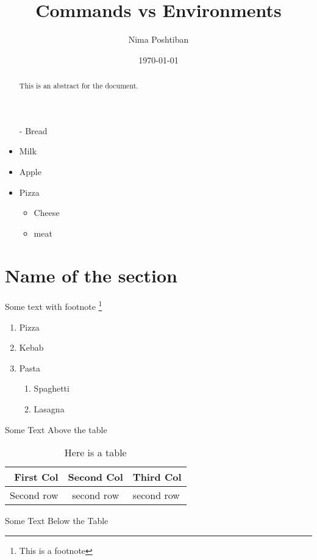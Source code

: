 \documentclass{article}
\title{Commands vs Environments}
\author{Nima Poshtiban}
\date{\today}
\begin{document}
\maketitle	
\begin{abstract}
	This is an abstract for the document.
\end{abstract}

\begin{itemize}
	\item[-] Bread %
	\item Milk
	\item Apple
	\item Pizza
	\begin{itemize}
		\item Cheese
		\item meat
	\end{itemize}
\end{itemize}
\section{Name of the section}
Some text with footnote \footnote[2]{This is a footnote}

\begin{enumerate}[I] %
	\item Pizza
	\item Kebab
	\item Pasta
	\begin{enumerate}
		\item Spaghetti
		\item Lasagna
	\end{enumerate}
\end{enumerate}

Some Text Above the table
\begin{table}[h] %
\centering %
\begin{tabular}{|r| c |l|}
\hline
First Col & Second Col & Third Col\\\hline %
Second row & second row & second row 
\end{tabular}
\caption{Here is a table}

\end{table}
Some Text Below the Table
\end{document}
